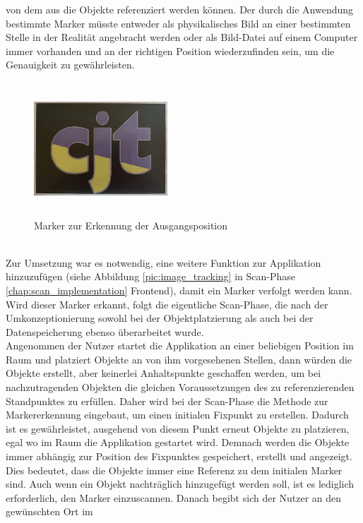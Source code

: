 von dem aus die Objekte referenziert werden können. Der durch die Anwendung bestimmte Marker müsste entweder als physikalisches Bild an einer bestimmten Stelle in der Realität 
angebracht werden oder als Bild-Datei auf einem Computer immer vorhanden und an der richtigen Position wiederzufinden sein, um die Genauigkeit zu gewährleisten. 
\begin{figure}[hbt!]
    \centering
    \includegraphics[width=5cm,height=5cm,keepaspectratio]{4Umsetzung/Bilder/cjt_logo_tracking.png}
    \caption{Marker zur Erkennung der Ausgangsposition}
    \label{pic:initialMarker}
\end{figure}
\\
Zur Umsetzung war es notwendig, eine weitere Funktion zur Applikation hinzuzufügen (siehe Abbildung \ref{pic:image_tracking} 
in Scan-Phase \ref{chap:scan_implementation} Frontend), damit ein Marker verfolgt werden kann. Wird dieser Marker erkannt, folgt die eigentliche Scan-Phase, 
die nach der Umkonzeptionierung sowohl bei der Objektplatzierung als auch bei der Datenspeicherung ebenso überarbeitet wurde. 
\\ 
\linebreak
Angenommen der Nutzer startet die Applikation an einer beliebigen Position im Raum und platziert Objekte an von ihm vorgesehenen Stellen, dann würden die 
Objekte erstellt, aber keinerlei Anhaltspunkte geschaffen werden, um bei nachzutragenden Objekten die gleichen Voraussetzungen des zu referenzierenden Standpunktes 
zu erfüllen. Daher wird bei der Scan-Phase die Methode zur Markererkennung eingebaut, um einen initialen Fixpunkt zu erstellen. Dadurch ist es gewährleistet, 
ausgehend von diesem Punkt erneut Objekte zu platzieren, egal wo im Raum die Applikation gestartet wird. Demnach werden die Objekte immer abhängig zur Position des 
Fixpunktes gespeichert, erstellt und angezeigt. Dies bedeutet, dass die Objekte immer eine Referenz zu dem initialen Marker sind. Auch wenn 
ein Objekt nachträglich hinzugefügt werden soll, ist es lediglich erforderlich, den Marker einzuscannen. Danach begibt sich der Nutzer an den gewünschten Ort im 
